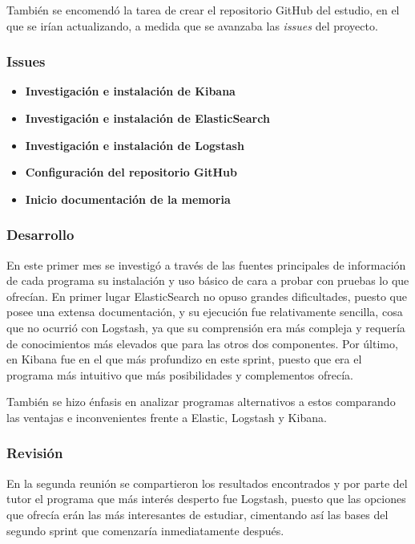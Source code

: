 También se encomendó la tarea de crear el repositorio GitHub del estudio, en el que se irían actualizando, a medida que se avanzaba las \textit{issues} del proyecto.

\subsubsection{Issues}
\begin{itemize}
    \item \textbf{Investigación e instalación de Kibana}
    \item \textbf{Investigación e instalación de ElasticSearch}
    \item \textbf{Investigación e instalación de Logstash}
    \item \textbf{Configuración del repositorio GitHub}
    \item \textbf{Inicio documentación de la memoria}

    \end{itemize}

\subsubsection{Desarrollo}
En este primer mes se investigó a través de las fuentes principales de información de cada programa su instalación y uso básico de cara a probar con pruebas lo que ofrecían. En primer lugar ElasticSearch no opuso grandes dificultades, puesto que posee una extensa documentación, y su ejecución fue relativamente sencilla, cosa que no ocurrió con Logstash, ya que su comprensión era más compleja y requería de conocimientos más elevados que para las otros dos componentes. Por último, en Kibana fue en el que más profundizo en este sprint, puesto que era el programa más intuitivo que más posibilidades y complementos ofrecía.

También se hizo énfasis en analizar programas alternativos a estos comparando las ventajas e inconvenientes frente a Elastic, Logstash y Kibana.

\subsubsection{Revisión}
En la segunda reunión se compartieron los resultados encontrados y por parte del tutor el programa que más interés desperto fue Logstash, puesto que las opciones que ofrecía erán las más interesantes de estudiar, cimentando así las bases del segundo sprint que comenzaría inmediatamente después.


